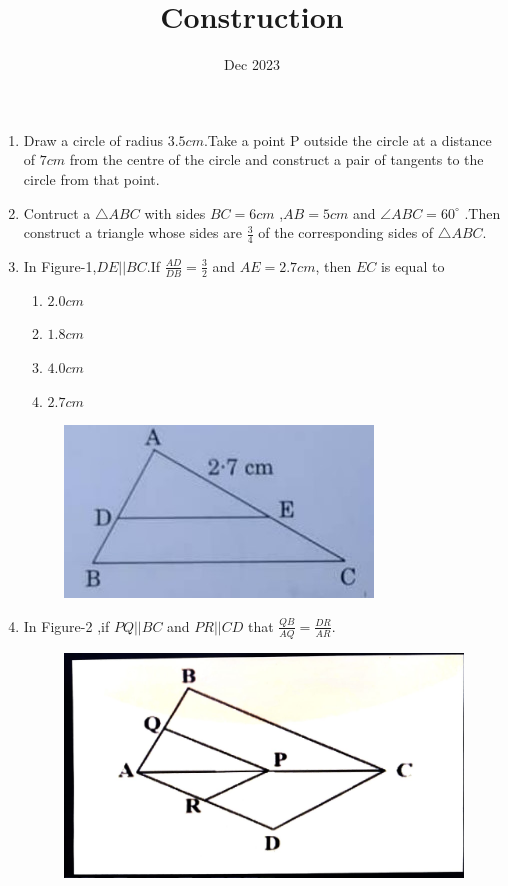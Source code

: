 \documentclass[12pt,-letter paper]{article}
\title{Construction}
\date{Dec 2023}
\begin{document}
\maketitle
\begin{enumerate}
\item Draw a circle of radius $3.5cm$.Take a point P outside the circle at a distance of $7cm$ from the centre of the circle and construct a pair of tangents to the circle from that point.

\item Contruct a $\triangle ABC $ with sides $BC = 6cm$ ,$AB = 5cm$ and $\angle ABC = 60^{\circ}$ .Then construct a triangle whose sides are $\frac{3}{4}$ of the corresponding sides of $\triangle ABC$.

\item In Figure-1,$DE || BC $.If $\frac{AD}{DB}=\frac{3}{2}$ and $AE = 2.7cm$, then $EC$ is equal to
\begin{enumerate}
		\item $2.0cm$ 
                \item $1.8cm$ 
                \item $4.0cm$
                \item $2.7cm$
\end{enumerate}
	\begin{figure}[H]
		\centering
		\includegraphics[width=0.5\columnwidth]{figs/Construction-1.jpg}
		\caption{}
	\end{figure}

\item In Figure-2 ,if $PQ || BC$ and $PR || CD$ that $\frac{QB}{AQ} = \frac{DR}{AR}$.
	\begin{figure}[H]
		\centering
		\includegraphics[width=0.5\columnwidth]{figs/Construction-2.jpg}
		\caption{}
	\end{figure}

\end{enumerate}
\end{document}
